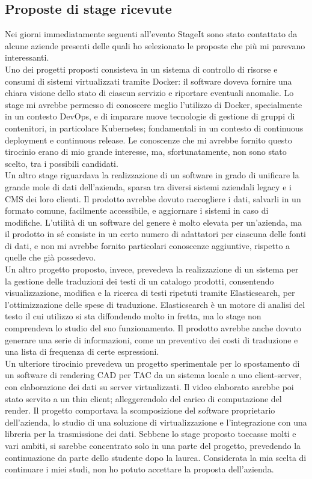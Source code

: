    \subsection{Proposte di stage ricevute}
   Nei giorni immediatamente seguenti all'evento StageIt sono stato contattato da alcune aziende presenti delle quali ho selezionato le proposte che più mi parevano interessanti.
   \\
   Uno dei progetti proposti consisteva in un sistema di controllo di risorse e consumi di sistemi virtualizzati tramite \gls{Docker}: il software doveva fornire una chiara visione dello stato di ciascun servizio e riportare eventuali anomalie. Lo stage mi avrebbe permesso di conoscere meglio l'utilizzo di Docker, specialmente in un contesto DevOps, e di imparare nuove tecnologie di gestione di gruppi di contenitori, in particolare Kubernetes; fondamentali in un contesto di continuous deployment e continuous release. Le conoscenze che mi avrebbe fornito questo tirocinio erano di mio grande interesse, ma, sfortunatamente, non sono stato scelto, tra i possibili candidati.
   \\
   Un altro stage riguardava la realizzazione di un software in grado di unificare la grande mole di dati dell'azienda, sparsa tra diversi sistemi aziendali legacy e i \gls{CMS} dei loro clienti. Il prodotto avrebbe dovuto raccogliere i dati, salvarli in un formato comune, facilmente accessibile, e aggiornare i sistemi in caso di modifiche. L'utilità di un software del genere è molto elevata per un'azienda, ma il prodotto in sé consiste in un certo numero di adattatori per ciascuna delle fonti di dati, e non mi avrebbe fornito particolari conoscenze aggiuntive, rispetto a quelle che già possedevo.
   \\
   Un altro progetto proposto, invece, prevedeva la realizzazione di un sistema per la gestione delle traduzioni dei testi di un catalogo prodotti, consentendo visualizzazione, modifica e la ricerca di testi ripetuti tramite Elasticsearch, per l'ottimizzazione delle spese di traduzione. Elasticsearch è un motore di analisi del testo il cui utilizzo si sta diffondendo molto in fretta, ma lo stage non comprendeva lo studio del suo funzionamento. Il prodotto avrebbe anche dovuto generare una serie di informazioni, come un preventivo dei costi di traduzione e una lista di frequenza di certe espressioni.
   \\
   Un ulteriore tirocinio prevedeva un progetto sperimentale per lo spostamento di un software di rendering \gls{CAD} per \gls{TAC} da un sistema locale a uno client-server, con elaborazione dei dati su server virtualizzati. Il video elaborato sarebbe poi stato servito a un \gls{thin client}; alleggerendolo del carico di computazione del render. Il progetto comportava la scomposizione del software proprietario dell'azienda, lo studio di una soluzione di virtualizzazione e l'integrazione con una libreria per la trasmissione dei dati. Sebbene lo stage proposto toccasse molti e vari ambiti, si sarebbe concentrato solo in una parte del progetto, prevedendo la continuazione da parte dello studente dopo la laurea. Considerata la mia scelta di continuare i miei studi, non ho potuto accettare la proposta dell'azienda.

